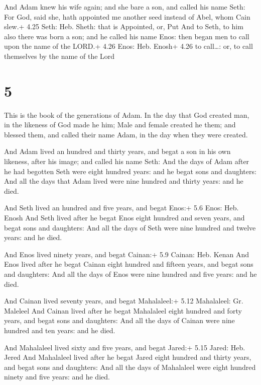  And Adam knew his wife again; and she bare a son, and
called his name Seth: For God, said she, hath appointed me another seed
instead of Abel, whom Cain slew.+ 4.25 Seth: Heb. Sheth: that is
Appointed, or, Put  And to Seth, to him also there was born
a son; and he called his name Enos: then began men to call upon the name
of the LORD.+ 4.26 Enos: Heb. Enosh+ 4.26 to call\ldots: or, to call
themselves by the name of the Lord

\hypertarget{section-4}{%
\section{5}\label{section-4}}

 This is the book of the generations of Adam. In the day
that God created man, in the likeness of God made he him; 
Male and female created he them; and blessed them, and called their name
Adam, in the day when they were created.

 And Adam lived an hundred and thirty years, and begat a
son in his own likeness, after his image; and called his name Seth:
 And the days of Adam after he had begotten Seth were eight
hundred years: and he begat sons and daughters:  And all the
days that Adam lived were nine hundred and thirty years: and he died.

 And Seth lived an hundred and five years, and begat Enos:+
5.6 Enos: Heb. Enosh  And Seth lived after he begat Enos
eight hundred and seven years, and begat sons and daughters:
 And all the days of Seth were nine hundred and twelve
years: and he died.

 And Enos lived ninety years, and begat Cainan:+ 5.9
Cainan: Heb. Kenan  And Enos lived after he begat Cainan
eight hundred and fifteen years, and begat sons and daughters:
 And all the days of Enos were nine hundred and five years:
and he died.

 And Cainan lived seventy years, and begat Mahalaleel:+
5.12 Mahalaleel: Gr. Maleleel  And Cainan lived after he
begat Mahalaleel eight hundred and forty years, and begat sons and
daughters:  And all the days of Cainan were nine hundred
and ten years: and he died.

 And Mahalaleel lived sixty and five years, and begat
Jared:+ 5.15 Jared: Heb. Jered  And Mahalaleel lived after
he begat Jared eight hundred and thirty years, and begat sons and
daughters:  And all the days of Mahalaleel were eight
hundred ninety and five years: and he died.

